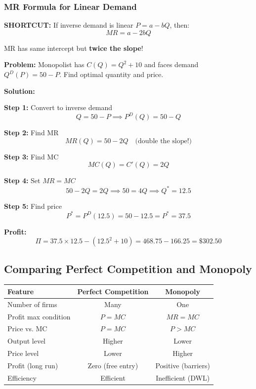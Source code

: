 \documentclass[10pt,letterpaper]{article}
\begin{document}
\subsubsection{MR Formula for Linear Demand}

\begin{tcolorbox}[colback=yellow!10,colframe=orange]
\textbf{SHORTCUT:} If inverse demand is linear $P = a - bQ$, then:
\[
\boxed{MR = a - 2bQ}
\]

MR has same intercept but \textbf{twice the slope}!
\end{tcolorbox}

\begin{examplebox}
\textbf{Problem:} Monopolist has $C(Q) = Q^2 + 10$ and faces demand $Q^D(P) = 50 - P$. Find optimal quantity and price.

\textbf{Solution:}

\textbf{Step 1:} Convert to inverse demand
\[
Q = 50 - P \implies P^D(Q) = 50 - Q
\]

\textbf{Step 2:} Find MR
\[
MR(Q) = 50 - 2Q \quad \text{(double the slope!)}
\]

\textbf{Step 3:} Find MC
\[
MC(Q) = C'(Q) = 2Q
\]

\textbf{Step 4:} Set $MR = MC$
\[
50 - 2Q = 2Q \implies 50 = 4Q \implies \boxed{Q^* = 12.5}
\]

\textbf{Step 5:} Find price
\[
P^* = P^D(12.5) = 50 - 12.5 = \boxed{P^* = 37.5}
\]

\textbf{Profit:}
\[
\Pi = 37.5 \times 12.5 - (12.5^2 + 10) = 468.75 - 166.25 = \boxed{\$302.50}
\]
\end{examplebox}

\subsection{Comparing Perfect Competition and Monopoly}

\begin{table}[h]
\centering
\begin{tabular}{lcc}
\toprule
\textbf{Feature} & \textbf{Perfect Competition} & \textbf{Monopoly} \\
\midrule
Number of firms & Many & One \\
Profit max condition & $P = MC$ & $MR = MC$ \\
Price vs. MC & $P = MC$ & $P > MC$ \\
Output level & Higher & Lower \\
Price level & Lower & Higher \\
Profit (long run) & Zero (free entry) & Positive (barriers) \\
Efficiency & Efficient & Inefficient (DWL) \\
\bottomrule
\end{tabular}
\end{table}
\end{document}
